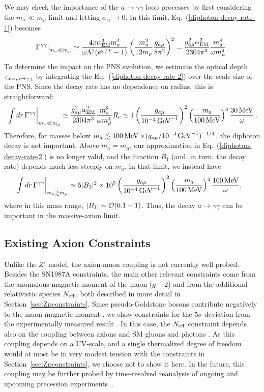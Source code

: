 \documentclass[11pt]{article}
\newcommand{\pL}{\left(} \newcommand{\pR}{\right)} \newcommand{\bL}{\left[} \newcommand{\bR}{\right]} \newcommand{\cbL}{\left\{} \newcommand{\cbR}{\right\}} \newcommand{\mL}{\left|} \newcommand{\mR}{\right|}
\newcommand{\beq}{\begin{equation}} \newcommand{\eeq}{\end{equation}}
\newcommand{\alg}[1]{\begin{align} \begin{split} #1 \end{split}  \end{align}}
\newcommand{\tenx}[1]{\times 10^{#1}}
\newcommand{\Eq}[1]{Eq.~(\ref{#1})} \newcommand{\Eqs}[2]{Eqs.~(\ref{#1}) and (\ref{#2})} \newcommand{\Eqm}[2]{Eqs.~(\ref{#1}) through (\ref{#2})}
\begin{document}
We may check the importance of the $a \rightarrow \gamma \gamma$ loop processes by first considering the $m_a \ll m_\mu$ limit and letting $c_{\gamma \gamma} \to 0$. In this limit,  \Eq{diphoton-decay-rate-1} becomes
\beq \label{diphoton-decay-rate-2}
\left. \Gamma^{\gamma \gamma} \mR_{m_a \ll m_\mu} \simeq \frac{4\pi \alpha_{\rm EM}^2 m_a^4}{\omega \Lambda^2  (e^{\omega/T} - 1 )} \pL  \frac{m_a^2}{12m_\mu} \frac{g_{a\mu}}{8\pi^2} \pR^2 = \frac{g_{a \mu}^2\alpha_{\rm EM}^2}{2304 \pi^3} \frac{m_a^8}{\omega m_\mu^4} \,.
\eeq
To determine the impact on the PNS evolution, we estimate the optical depth $\tau_{{\rm abs},a \to \gamma \gamma}$ by integrating the \Eq{diphoton-decay-rate-2} over the scale size of the PNS. Since the decay rate has no dependence on radius, this is straightforward:
\beq
\left. \int dr\, \Gamma^{\gamma \gamma} \mR_{m_a \ll m_\mu} \simeq \frac{g_{a \mu}^2\alpha_{\rm EM}^2}{2304 \pi^3} \frac{m_a^8}{\omega m_\mu^4}R_c \simeq 1 \pL \frac{g_{a\mu}}{10^{-4} \gev^{-1}} \pR^2 \pL \frac{m_a}{100\mev} \pR^8 \frac{30\mev}{\omega}\,.
\label{eq:optdeplowaxion}
\eeq
Therefore, for masses below $m_a \lesssim 100\operatorname{MeV} \times(g_{a\mu}/10^{-4} \operatorname{GeV}^{-1})^{-1/4}$, the diphoton decay is not important.
Above $m_a = m_\mu$, our approximation in \Eq{diphoton-decay-rate-2} is no longer valid, and the function $B_1$ (and, in turn, the decay rate) depends much less steeply on $m_a$. In that limit, we instead have
\alg{ \label{diphoton-decay-rate-3}
\left. \int dr\, \Gamma^{\gamma \gamma} \mR_{m_a \gtrsim m_\mu} &\simeq 5 |B_1|^2\tenx5 \pL \frac{g_{a\mu}}{10^{-4} \gev^{-1}} \pR^2 \pL \frac{m_a}{100\mev} \pR^4 \frac{100\mev}{\omega},
}
where in this mass range, $|B_1|\sim {\cal O}(0.1-1)$. Thus, the decay $a \to \gamma \gamma$ can be important in the massive-axion limit.


\subsection{Existing Axion Constraints}
\label{sec:axionconstraints}

Unlike the $Z'$ model, the axion-muon coupling is not currently well probed. Besides the SN1987A constraints, the main other relevant constraints come from the anomalous magnetic moment of the muon ($g-2$) and from the additional relativistic species $N_{\rm eff}$, both described in more detail in Section~\ref{sec:Zpconstraints}. 
Since pseudo-Goldstone bosons contribute negatively to the muon magnetic moment \cite{Essig:2010gu}, we show constraints for the $5\sigma$ deviation from the experimentally measured result \cite{Tanabashi:2018oca}.
In this case, the $N_{\rm eff}$ constraint depends also on the coupling between axions and SM gluons and photons \cite{Baumann:2016wac}. As this coupling depends on a UV-scale, and a single thermalized degree of freedom would at most be in very modest tension with the constraints in Section~\ref{sec:Zpconstraints}, we choose not to show it here. In the future, this coupling may be further probed by time-resolved reanalysis of ongoing and upcoming precession experiments~\cite{Janish:2020knz}.
\end{document}
